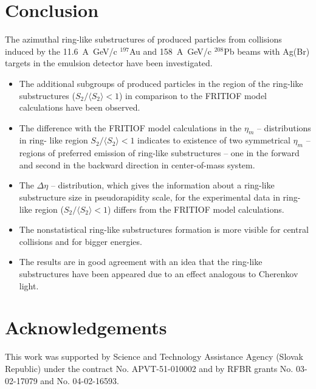 \documentclass[12pt]{article}
\newcommand{\SDVA}{\langle S_2 \rangle}
\begin{document}
\section{Conclusion}

The azimuthal ring-like substructures of produced particles from collisions induced by the 11.6~A~GeV/c ${}^{197}$Au and 158~A~GeV/c ${}^{208}$Pb beams with Ag(Br) targets in the emulsion detector have been investigated.
\begin{itemize}
\item The additional subgroups of produced particles in the region of the ring-like substructures  
      ($S_2/\SDVA < 1$) in comparison to the FRITIOF model calculations have been observed.
\item The difference with the FRITIOF model calculations in the $\eta_m$ -- distributions in ring-
      like region $S_2/\SDVA < 1$ indicates to existence of two symmetrical $\eta_m$ -- regions of 
      preferred emission of ring-like substructures -- one in the forward and second in the 
      backward direction in center-of-mass system.
\item The $\Delta\eta$ -- distribution, which gives the information about a ring-like substructure 
      size in pseudorapidity scale, for the experimental data in ring-like region ($S_2/\SDVA < 1
      $) differs from the FRITIOF model calculations.
\item The nonstatistical ring-like substructures formation is more visible for central collisions 
      and for bigger energies. 
\item The results are in good agreement with an idea that the ring-like substructures have been 
      appeared due to an effect analogous to Cherenkov light.
\end{itemize}


\section*{Acknowledgements}

This work was supported by Science and Technology Assistance Agency (Slovak Republic) under the contract No. APVT-51-010002 and by RFBR grants No. 03-02-17079 and No. 04-02-16593.
\end{document}

